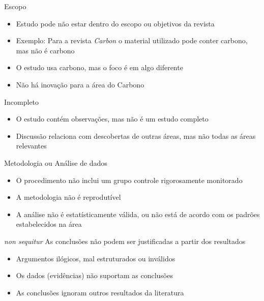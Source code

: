\documentclass{beamer}
\begin{document}
\begin{frame}{Escopo}
  \begin{itemize}
    \footnotesize
  \item Estudo pode não estar dentro do escopo ou objetivos da revista
    \bigskip
  \item Exemplo: Para a revista {\em Carbon} o material utilizado pode
    conter carbono, mas não é carbono
    \bigskip
  \item O estudo usa carbono, mas o foco é em algo diferente
    \bigskip
  \item Não há inovação para a área do Carbono
  \end{itemize}
\end{frame}

\begin{frame}{Incompleto}
  \begin{itemize}
    \footnotesize
  \item O estudo contém observações, mas não é um estudo completo
    \bigskip
  \item Discussão relaciona com descobertas de outras áreas, mas não
    todas as áreas relevantes
  \end{itemize}
\end{frame}

\begin{frame}{Metodologia ou Análise de dados}
  \begin{itemize}
    \footnotesize
  \item O procedimento não inclui um grupo controle rigorosamente
    monitorado
    \bigskip
  \item A metodologia não é reprodutível
    \bigskip
  \item A análise não é estatísticamente válida, ou não está de acordo
    com os padrões estabelecidos na área
  \end{itemize}
\end{frame}

\begin{frame}{{\em non sequitur}}
  As conclusões não podem ser justificadas a partir dos resultados
  \begin{itemize}
    \footnotesize
  \item Argumentos ilógicos, mal estruturados ou inválidos
    \bigskip
  \item Os dados (evidências) não suportam as conclusões
    \bigskip
  \item As conclusões ignoram outros resultados da literatura
  \end{itemize}
\end{frame}
\end{document}
